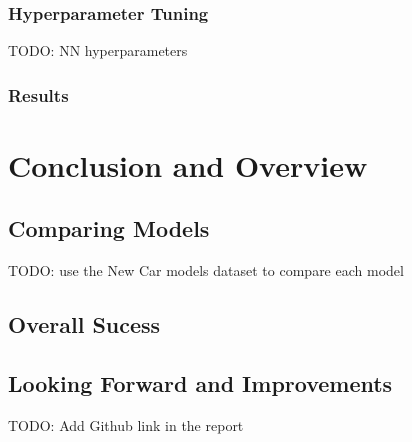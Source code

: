 \documentclass[12pt,twocolumn]{article}
\begin{document}
\subsubsection{Hyperparameter Tuning}
TODO: NN hyperparameters

\subsubsection{Results}

\section{Conclusion and Overview}
\subsection{Comparing Models}
TODO: use the New Car models dataset to compare each model

\subsection{Overall Sucess}

\subsection{Looking Forward and Improvements}

\newpage
TODO: Add Github link in the report
\end{document}
